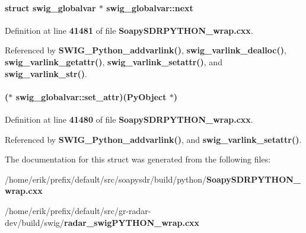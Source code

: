 \paragraph[{next}]{\setlength{\rightskip}{0pt plus 5cm}struct {\bf swig\+\_\+globalvar} $\ast$ swig\+\_\+globalvar\+::next}\label{structswig__globalvar_a9b2b63ce956d35d5270e6460e3a1601e}


Definition at line {\bf 41481} of file {\bf Soapy\+S\+D\+R\+P\+Y\+T\+H\+O\+N\+\_\+wrap.\+cxx}.



Referenced by {\bf S\+W\+I\+G\+\_\+\+Python\+\_\+addvarlink()}, {\bf swig\+\_\+varlink\+\_\+dealloc()}, {\bf swig\+\_\+varlink\+\_\+getattr()}, {\bf swig\+\_\+varlink\+\_\+setattr()}, and {\bf swig\+\_\+varlink\+\_\+str()}.

\paragraph[{set\+\_\+attr}]{($\ast$ swig\+\_\+globalvar\+::set\+\_\+attr)(Py\+Object $\ast$)}\label{structswig__globalvar_a494e3d5a5f1fb694b7738fdd1ffdd657}


Definition at line {\bf 41480} of file {\bf Soapy\+S\+D\+R\+P\+Y\+T\+H\+O\+N\+\_\+wrap.\+cxx}.



Referenced by {\bf S\+W\+I\+G\+\_\+\+Python\+\_\+addvarlink()}, and {\bf swig\+\_\+varlink\+\_\+setattr()}.



The documentation for this struct was generated from the following files\+:\begin{DoxyCompactItemize}
\item 
/home/erik/prefix/default/src/soapysdr/build/python/{\bf Soapy\+S\+D\+R\+P\+Y\+T\+H\+O\+N\+\_\+wrap.\+cxx}\item 
/home/erik/prefix/default/src/gr-\/radar-\/dev/build/swig/{\bf radar\+\_\+swig\+P\+Y\+T\+H\+O\+N\+\_\+wrap.\+cxx}\end{DoxyCompactItemize}
